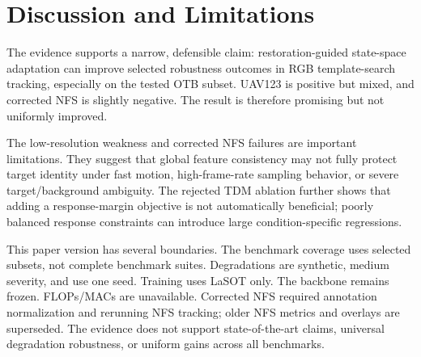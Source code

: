 \section{Discussion and Limitations}

The evidence supports a narrow, defensible claim: restoration-guided state-space adaptation can improve selected robustness outcomes in RGB template-search tracking, especially on the tested OTB subset. UAV123 is positive but mixed, and corrected NFS is slightly negative. The result is therefore promising but not uniformly improved.

The low-resolution weakness and corrected NFS failures are important limitations. They suggest that global feature consistency may not fully protect target identity under fast motion, high-frame-rate sampling behavior, or severe target/background ambiguity. The rejected TDM ablation further shows that adding a response-margin objective is not automatically beneficial; poorly balanced response constraints can introduce large condition-specific regressions.

This paper version has several boundaries. The benchmark coverage uses selected subsets, not complete benchmark suites. Degradations are synthetic, medium severity, and use one seed. Training uses LaSOT only. The backbone remains frozen. FLOPs/MACs are unavailable. Corrected NFS required annotation normalization and rerunning NFS tracking; older NFS metrics and overlays are superseded. The evidence does not support state-of-the-art claims, universal degradation robustness, or uniform gains across all benchmarks.
